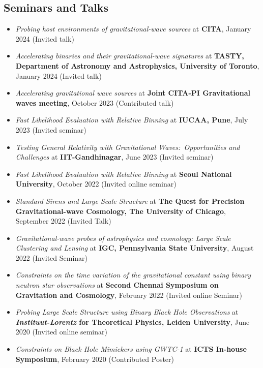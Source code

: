 \documentclass[11pt, margin, centered, letterpaper]{res}
\begin{document}
\begin{resume}
\section{Seminars and Talks}
\begin{itemize}[leftmargin=*]
    \item \textit{Probing host environments of gravitational-wave sources} at \textbf{CITA}, January 2024 (Invited talk)
    \item \textit{Accelerating binaries and their gravitational-wave signatures} at \textbf{TASTY, Department of Astronomy and Astrophysics, University of Toronto}, January 2024 (Invited talk)
    \item \textit{Accelerating gravitational wave sources} at \textbf{Joint CITA-PI Gravitational waves meeting}, October 2023 (Contributed talk)
    \item \textit{Fast Likelihood Evaluation with Relative Binning} at\textbf{ IUCAA, Pune}, July 2023 (Invited seminar)
    \item \textit{Testing General Relativity with Gravitational Waves:\ Opportunities and Challenges} at \textbf{IIT-Gandhinagar}, June 2023 (Invited seminar)
    \item \textit{Fast Likelihood Evaluation with Relative Binning} at \textbf{Seoul National University}, October 2022 (Invited online seminar)
    \item \textit{Standard Sirens and Large Scale Structure} at \textbf{The Quest for Precision Gravitational-wave Cosmology, The University of Chicago}, September 2022 (Invited Talk)    \item \textit{Gravitational-wave probes of astrophysics and cosmology: Large Scale Clustering and Lensing} at \textbf{IGC, Pennsylvania State University}, August 2022 (Invited Seminar)
	 \item \textit{Constraints on the time variation of the gravitational constant using binary neutron star observations} at \textbf{Second Chennai Symposium on Gravitation and Cosmology}, February 2022 (Invited online Seminar)
	 \item \textit{Probing Large Scale Structure using Binary Black Hole Observations} at \textbf{\textit{Instituut-Lorentz} for Theoretical Physics, Leiden University}, June 2020 (Invited online seminar)
	 \item \textit{Constraints on Black Hole Mimickers using GWTC-1} at \textbf{ICTS In-house Symposium}, February 2020 (Contributed Poster)

\end{itemize}
\end{resume}
\end{document}
